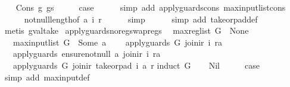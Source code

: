 \begin{isabellebody}
\isanewline
\ \ \isamarkupfalse%
\ {\isacharparenleft}Cons\ g\ gs{\isacharparenright}\isanewline
\ \ \isamarkupfalse%
\ \isamarkupfalse%
\ {\isacharquery}case\isanewline
\ \ \ \ \isamarkupfalse%
\ {\isacharparenleft}simp\ add{\isacharcolon}\ apply{\isacharunderscore}guards{\isacharunderscore}cons\ max{\isacharunderscore}input{\isacharunderscore}list{\isacharunderscore}cons{\isacharparenright}\isanewline
\ \ \ \ \isamarkupfalse%
\ not{\isacharunderscore}null{\isacharunderscore}length{\isacharbrackleft}of\ a\ i\ r{\isacharbrackright}\isanewline
\ \ \ \ \isamarkupfalse%
\ simp\isanewline
\ \ \ \ \isamarkupfalse%
\ {\isacharparenleft}simp\ add{\isacharcolon}\ take{\isacharunderscore}or{\isacharunderscore}pad{\isacharunderscore}def{\isacharparenright}\isanewline
\ \ \ \ \isamarkupfalse%
\ {\isacharparenleft}metis\ gval{\isacharunderscore}take{\isacharparenright}\isanewline
{}\isamarkupfalse%
%
\endisatagproof
{\isafoldproof}%
%
\isadelimproof
\isanewline
%
\endisadelimproof
\isanewline
{}\isamarkupfalse%
\ apply{\isacharunderscore}guards{\isacharunderscore}no{\isacharunderscore}reg{\isacharunderscore}swap{\isacharunderscore}regs{\isacharcolon}\isanewline
\ \ {\isachardoublequoteopen}max{\isacharunderscore}reg{\isacharunderscore}list\ G\ {\isacharequal}\ None\ {\isasymLongrightarrow}\isanewline
\ \ \ max{\isacharunderscore}input{\isacharunderscore}list\ G\ {\isacharless}\ Some\ a\ {\isasymLongrightarrow}\isanewline
\ \ \ apply{\isacharunderscore}guards\ G\ {\isacharparenleft}join{\isacharunderscore}ir\ i\ ra{\isacharparenright}\ {\isasymLongrightarrow}\isanewline
\ \ \ apply{\isacharunderscore}guards\ {\isacharparenleft}ensure{\isacharunderscore}not{\isacharunderscore}null\ a{\isacharparenright}\ {\isacharparenleft}join{\isacharunderscore}ir\ i\ ra{\isacharparenright}\ {\isasymLongrightarrow}\isanewline
\ \ \ apply{\isacharunderscore}guards\ G\ {\isacharparenleft}join{\isacharunderscore}ir\ {\isacharparenleft}take{\isacharunderscore}or{\isacharunderscore}pad\ i\ a{\isacharparenright}\ r{\isacharparenright}{\isachardoublequoteclose}\isanewline
%
\isadelimproof
%
\endisadelimproof
%
\isatagproof
{}\isamarkupfalse%
{\isacharparenleft}induct\ G{\isacharparenright}\isanewline
\ \ \isamarkupfalse%
\ Nil\isanewline
\ \ \isamarkupfalse%
\ \isamarkupfalse%
\ {\isacharquery}case\isanewline
\ \ \ \ \isamarkupfalse%
\ {\isacharparenleft}simp\ add{\isacharcolon}\ max{\isacharunderscore}input{\isacharunderscore}def{\isacharparenright}\isanewline

\end{isabellebody}
